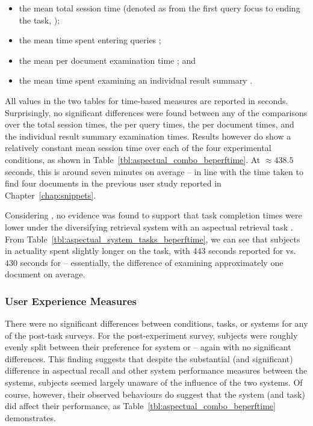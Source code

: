 \begin{itemize}
    \item{the mean total session time (denoted as from the first query focus to ending the task, );}
    \item{the mean time spent entering queries ;}
    \item{the mean per document examination time ; and}
    \item{the mean time spent examining an individual result summary .}
\end{itemize}

All values in the two tables for time-based measures are reported in seconds. Surprisingly, no significant differences were found between any of the comparisons over the total session times, the per query times, the per document times, and the individual result summary examination times. Results however do show a relatively constant mean session time over each of the four experimental conditions, as shown in Table~\ref{tbl:aspectual_combo_beperftime}. At $\approx 438.5$ seconds, this is around seven minutes on average -- in line with the time taken to find four documents in the previous user study reported in Chapter~\ref{chap:snippets}.

Considering , no evidence was found to support that task completion times were lower under the diversifying retrieval system with an aspectual retrieval task . From Table~\ref{tbl:aspectual_system_tasks_beperftime}, we can see that subjects in actuality spent slightly longer on the task, with $443$ seconds reported for  vs. $430$ seconds for  -- essentially, the difference of examining approximately one document on average.

\subsubsection{User Experience Measures}\label{sec:diversity:users:results:experience}
There were no significant differences between conditions, tasks, or systems for any of the post-task surveys. For the post-experiment survey, subjects were roughly evenly split between their preference for system  or  -- again with no significant differences. This finding suggests that despite the substantial (and significant) difference in aspectual recall and other system performance measures between the systems, subjects seemed largely unaware of the influence of the two systems. Of course, however, their observed behaviours do suggest that the system (and task) did affect their performance, as Table~\ref{tbl:aspectual_combo_beperftime} demonstrates.

